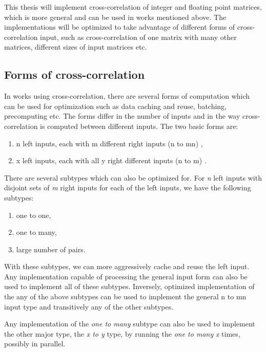 This thesis will implement cross-correlation of integer and floating point matrices, which is more general and can be used in works mentioned above. The implementations will be optimized to take advantage of different forms of cross-correlation input, such as cross-correlation of one matrix with many other matrices, different sizes of input matrices etc. 

\subsection{Forms of cross-correlation}

In works using cross-correlation, there are several forms of computation which can be used for optimization such as data caching and reuse, batching, precomputing etc. The forms differ in the number of inputs and in the way cross-correlation is computed between different inputs. 
The two basic forms are:

\begin{enumerate}
	\item n left inputs, each with m different right inputs (n to mn) \citet{misko} \citet{zhang2015} \citet{Kapinchev2015}, 
	\item x left inputs, each with all y right different inputs (n to m) \citet{Clark2011}.
\end{enumerate} 

There are several subtypes which can also be optimized for. For \textit{n} left inputs with disjoint sets of \textit{m} right inputs for each of the left inputs, we have the following subtypes:

\begin{enumerate}
	\item one to one,
	\item one to many,
	\item large number of pairs.
\end{enumerate}

With these subtypes, we can more aggressively cache and reuse the left input. Any implementation capable of processing the general input form can also be used to implement all of these subtypes.
Inversely, optimized implementation of the any of the above subtypes can be used to implement the general n to mn input type and transitively any of the other subtypes.

Any implementation of the \textit{one to many} subtype can also be used to implement the other major type, the \textit{x to y} type, by running the \textit{one to many} \textit{x} times, possibly in parallel.


